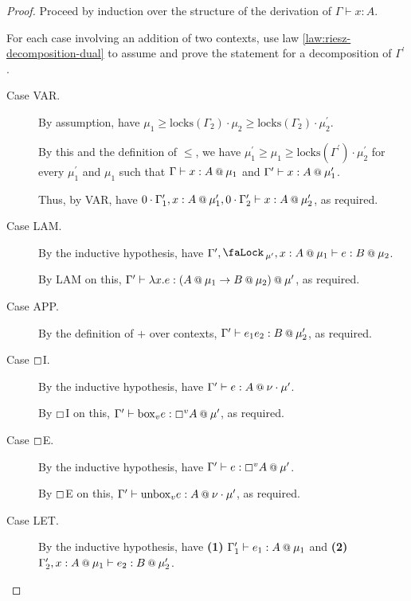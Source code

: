 \documentclass[acmsmall,screen,nonacm]{acmart}
\makeatletter
\newcommand{\at}{\mathbin{\mbox{\small\ensuremath{@}}}}
\newcommand{\tee}{\vdash}
\DeclareMathOperator{\lock}{\tikz{\node[scale=1, line width=0pt, inner sep=0pt] at (0,0) {\faLock\,};}}
\makeatother
\begin{document}
\begin{proof}
  Proceed by induction over the structure of the derivation of $\Gamma \tee x : A$.

  For each case involving an addition of two contexts, use law \ref{law:riesz-decomposition-dual} to assume and prove the statement for a decomposition of $\Gamma^\prime$.
  \begin{description}
    \item[Case VAR.]
    By assumption, have $\mu_1 \ge \mathrm{locks}(\Gamma_2) \cdot \mu_2 \ge \mathrm{locks}(\Gamma_2) \cdot \mu_2^\prime$. 
    
    By this and the definition of $\le$, we have $\mu_1^\prime \ge \mu_1 \ge \mathrm{locks}(\Gamma^\prime) \cdot \mu_2^\prime$ for every $\mu_1^\prime$ and $\mu_1$ such that $\Gamma \tee x : A \at \mu_1$ and $\Gamma^\prime \tee x : A \at \mu^\prime_1$. 
    
    Thus, by VAR, have $0 \cdot \Gamma^\prime_1, x : A \at \mu_1^\prime, 0 \cdot \Gamma^\prime_2 \tee x : A \at \mu_2^\prime$, as required.
    \\
    \item[Case LAM.]
    By the inductive hypothesis, have $\Gamma^\prime, \lock_{\mu^\prime}, x : A \at \mu_1 \tee e : B \at \mu_2$. 
    
    By LAM on this, $\Gamma^\prime \tee \lambda x.e : (A \at \mu_1 \rightarrow B \at \mu_2) \at \mu^\prime$, as required.
    \\
    \item[Case APP.]
    By the definition of $+$ over contexts, $\Gamma^\prime \tee e_1 e_2 : B \at \mu_2^\prime$, as required.
    \\
    \item[Case $\boxempty$I.]
    By the inductive hypothesis, have $\Gamma^\prime \tee e : A \at \nu \cdot \mu^\prime$.
    
    By $\boxempty$I on this, $\Gamma^\prime \tee \mathrm{box}_ve : \boxempty^vA \at \mu^\prime$, as required.
    \\
    \item[Case $\boxempty$E.]
    By the inductive hypothesis, have $\Gamma^\prime \tee e : \boxempty^vA \at \mu^\prime$.
    
    By $\boxempty$E on this, $\Gamma^\prime \tee \mathrm{unbox}_ve : A \at \nu \cdot \mu^\prime$, as required.
    \\
    \item[Case LET.]
    By the inductive hypothesis, have \textbf{(1)} $\Gamma^\prime_1 \tee e_1 : A \at \mu_1$ and \textbf{(2)} $\Gamma^\prime_2, x : A \at \mu_1 \tee e_2 : B \at \mu_2^\prime$.
    

\end{description}
\end{proof}
\end{document}
